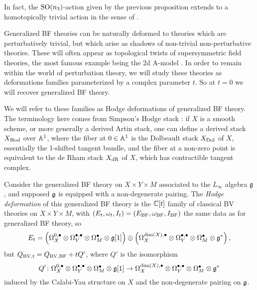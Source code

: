 \documentclass[10pt, oneside]{article}
\begin{document}
\begin{remark}
In fact, the $\mathrm{SO}(n_3)$-action given by the previous proposition extends to a homotopically trivial action in the sense of \cite[Section 2.4]{ElliottSafronov}.
\end{remark}

Generalized BF theories can be naturally deformed to theories which are perturbatively trivial, but which arise as shadows of non-trivial non-perturbative theories.  These will often appear as topological twists of supersymmetric field theories, the most famous example being the 2d A-model .  In order to remain within the world of perturbation theory, we will study these theories as deformations families parameterized by a complex parameter $t$.  So at $t=0$ we will recover generalized BF theory.

We will refer to these families as Hodge deformations of generalized BF theory.  The terminology here comes from Simpson's Hodge stack \cite{Simpson}: if $X$ is a smooth scheme, or more generally a derived Artin stack, one can define a derived stack $X_{\mathrm{Hod}}$ over $\mathbb{A}^1$, where the fiber at $0 \in \mathbb{A}^1$ is the Dolbeault stack $X_{\mathrm{Dol}}$ of $X$, essentially the 1-shifted tangent bundle, and the fiber at a non-zero point is equivalent to the de Rham stack $X_{\mathrm{dR}}$ of $X$, which has contractible tangent complex.

\begin{definition} \label{Hodge_family_def}
Consider the generalized BF theory on $X \times Y \times M$ associated to the $L_\infty$ algebra $\mathfrak g$, and supposed $\mathfrak g$ is equipped with a non-degenerate pairing.  The \emph{Hodge deformation} of this generalized BF theory is the $\mathbb C[t]$ family of classical BV theories on $X \times Y \times M$, with $(E_t, \omega_t, I_t) = (E_{\mathrm{BF}}, \omega_{\mathrm{BF}}, I_{\mathrm{BF}})$ the same data as for generalized BF theory, so 
\[E_t = \left(\Omega^{0,\bullet}_X \otimes \Omega^{\bullet,\bullet}_Y \otimes \Omega^\bullet_M \otimes \mathfrak g[1] \right)\oplus \left(\Omega^{\dim(X),\bullet}_X \otimes \Omega^{\bullet,\bullet}_Y \otimes \Omega^\bullet_M\otimes \mathfrak g^*\right),\]
but $Q_{\mathrm{BV},t} = Q_{\text{BV,BF}} + tQ'$, where $Q'$ is the isomorphism
\[Q' \colon \Omega^{0,\bullet}_X \otimes \Omega^{\bullet,\bullet}_Y \otimes \Omega^\bullet_M \otimes \mathfrak g[1] \to 
\Omega^{\dim(X),\bullet}_X \otimes \Omega^{\bullet,\bullet}_Y \otimes \Omega^\bullet_M\otimes \mathfrak g^*\]
induced by the Calabi-Yau structure on $X$ and the non-degenerate pairing on $\mathfrak g$. 
\end{definition}
\end{document}
